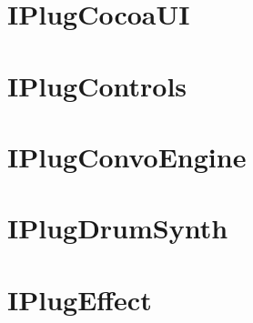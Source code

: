 \let\mypdfximage\pdfximage\def\pdfximage{\immediate\mypdfximage}\documentclass[twoside]{book}
\newcommand{\+}{\discretionary{\mbox{\scriptsize$\hookleftarrow$}}{}{}}
\begin{document}
\chapter{I\+Plug\+Cocoa\+UI}
\label{md__c_1__users_fab_src__github_branches__neural_amp_modeler_plugin_i_plug2__examples__i_plug_cocoa_u_i__r_e_a_d_m_e}

\chapter{I\+Plug\+Controls}
\label{md__c_1__users_fab_src__github_branches__neural_amp_modeler_plugin_i_plug2__examples__i_plug_controls__r_e_a_d_m_e}

\chapter{I\+Plug\+Convo\+Engine}
\label{md__c_1__users_fab_src__github_branches__neural_amp_modeler_plugin_i_plug2__examples__i_plug_convo_engine__r_e_a_d_m_e}

\chapter{I\+Plug\+Drum\+Synth}
\label{md__c_1__users_fab_src__github_branches__neural_amp_modeler_plugin_i_plug2__examples__i_plug_drum_synth__r_e_a_d_m_e}

\chapter{I\+Plug\+Effect}
\label{md__c_1__users_fab_src__github_branches__neural_amp_modeler_plugin_i_plug2__examples__i_plug_effect__r_e_a_d_m_e}

\end{document}
